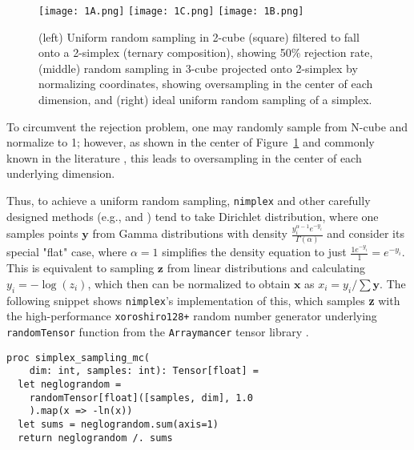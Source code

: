 \begin{figure}[h]
    \centering
    \texttt{[image: 1A.png]}
    \hfill
    \texttt{[image: 1C.png]}
    \hfill
    \texttt{[image: 1B.png]}
    \caption{(left) Uniform random sampling in 2-cube (square) filtered to fall onto a 2-simplex (ternary composition), showing 50\% rejection rate, (middle) random sampling in 3-cube projected onto 2-simplex by normalizing coordinates, showing oversampling in the center of each dimension, and (right) ideal uniform random sampling of a simplex.} 
    \label{fig:samplinginternary}
\end{figure}

To circumvent the rejection problem, one may randomly sample from N-cube and normalize to 1; however, as shown in the center of Figure~\ref{fig:samplinginternary} and commonly known in the literature \cite{Otis2017AnSystems}, this leads to oversampling in the center of each underlying dimension.

Thus, to achieve a uniform random sampling, \texttt{nimplex} and other carefully designed methods (e.g., \cite{Allen2022AAlloys} and \cite{Otis2017AnSystems}) tend to take Dirichlet distribution, where one samples points $\textbf{y}$ from Gamma distributions with density $\frac{y_i^{\alpha-1} e^{-y_i}}{\Gamma(\alpha)}$ and consider its special "flat" case, where $\alpha=1$ simplifies the density equation to just $\frac{1 e^{-y_i}}{1} = e^{-y_i}$. This is equivalent to sampling $\textbf{z}$ from linear distributions and calculating $y_i=-\log(z_i)$, which then can be normalized to obtain $\textbf{x}$ as $x_i = y_i / \sum \textbf{y}$. The following snippet shows \texttt{nimplex}'s implementation of this, which samples \textbf{z} with the high-performance \texttt{xoroshiro128+} random number generator \cite{Blackman2018ScrambledGenerators} underlying \texttt{randomTensor} function from the \texttt{Arraymancer} tensor library \cite{RatsimbazafyMratsim/Arraymancer:Backends}.

\begin{verbatim}
proc simplex_sampling_mc(
    dim: int, samples: int): Tensor[float] =
  let neglograndom = 
    randomTensor[float]([samples, dim], 1.0
    ).map(x => -ln(x))
  let sums = neglograndom.sum(axis=1)
  return neglograndom /. sums
\end{verbatim}

